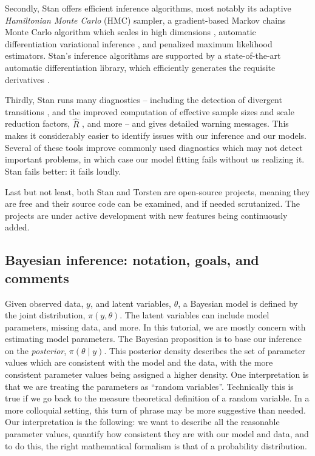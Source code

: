 Secondly, Stan offers efficient inference algorithms, most notably its adaptive \textit{Hamiltonian Monte Carlo} (HMC) sampler, a gradient-based Markov chains Monte Carlo algorithm which scales in high dimensions \cite{Betancourt:2018, Hoffman:2014}, automatic differentiation variational inference \cite{author:0000}, and penalized maximum likelihood estimators.
Stan's inference algorithms are supported by a state-of-the-art automatic differentiation library, which efficiently generates the requisite derivatives \cite{Carpenter:2015}.

Thirdly, Stan runs many diagnostics -- including the detection of divergent transitions \cite{Betancourt:2018}, and the improved computation of effective sample sizes and scale reduction factors, $\hat R$ \cite{Vehtari:2020}, and more -- and gives detailed warning messages.
This makes it considerably easier to identify issues with our inference and our models.
Several of these tools improve commonly used diagnostics which may not detect important problems, in which case our model fitting fails without us realizing it.
Stan fails better: it fails loudly. 

Last but not least, both Stan and Torsten are open-source projects, meaning  they are free and their source code can be examined, and if needed scrutanized.
The projects are under active development with new features being continuously added.

\subsection{Bayesian inference: notation, goals, and comments}

Given observed data, $y$, and latent variables, $\theta$, a Bayesian model is defined by the joint distribution, $\pi(y, \theta)$.
The latent variables can include model parameters, missing data, and more.
In this tutorial, we are mostly concern with estimating model parameters.
The Bayesian proposition is to base our inference on the \textit{posterior}, $\pi(\theta \mid y)$.
This posterior density describes the set of parameter values which are consistent with the model and the data, with the more consistent parameter values being assigned a higher density.
One interpretation is that we are treating the parameters as ``random variables''.
Technically this is true if we go back to the measure theoretical definition of a random variable. 
In a more colloquial setting, this turn of phrase may be more suggestive than needed.
Our interpretation is the following: we want to describe all the reasonable parameter values, quantify how consistent they are with our model and data, and to do this, the right mathematical formalism is that of a probability distribution.


